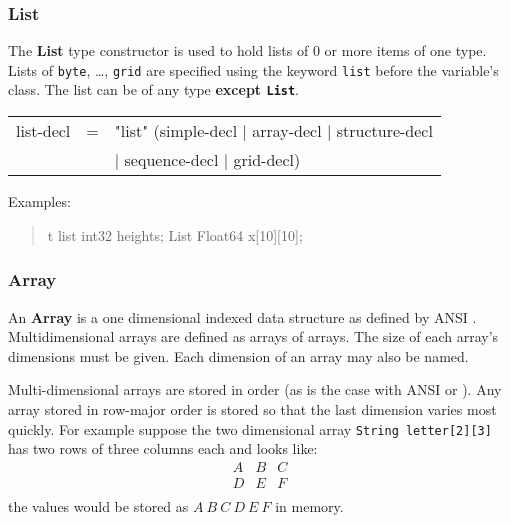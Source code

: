 \documentclass{article}
\begin{document}
\subsubsection{List}
\label{sec:list}

 The \textbf{List} type constructor is used to hold lists of 0 or
  more items of one type. Lists of \texttt{byte}, \ldots, \texttt{grid} are
  specified using the keyword \texttt{list} before the variable's class. The
  list can be of any type \textbf{except \texttt{List}}.

\begin{ttfamily}
\begin{center}
\begin{tabular}{lll}
list-decl & = & "list" (simple-decl  | array-decl | structure-decl \\
          & & | sequence-decl | grid-decl) \\
\end{tabular}
\end{center}
\end{ttfamily}

Examples:
\begin{quote}
\begin{vcode}{t}
list int32 heights;
List Float64 x[10][10];
\end{vcode}
\end{quote}

\subsubsection{Array}
An \textbf{Array} is a one dimensional indexed data structure as defined by
ANSI \C. Multidimensional arrays are defined as arrays of arrays. The size of
each array's dimensions must be given. Each dimension of an array may also be
named.

Multi-dimensional arrays are stored in  order (as is
the case with ANSI \C or \Cpp). Any array stored in row-major order is stored
so that the last dimension varies most quickly. For example suppose the two
dimensional array \texttt{String letter[2][3]} has two rows of three columns
each and looks like:
\begin{displaymath}
\begin{array}{ccc}
A & B & C \\
D & E & F \\
\end{array}
\end{displaymath}
the values would be stored as $A~B~C~D~E~F$ in memory.
\end{document}
